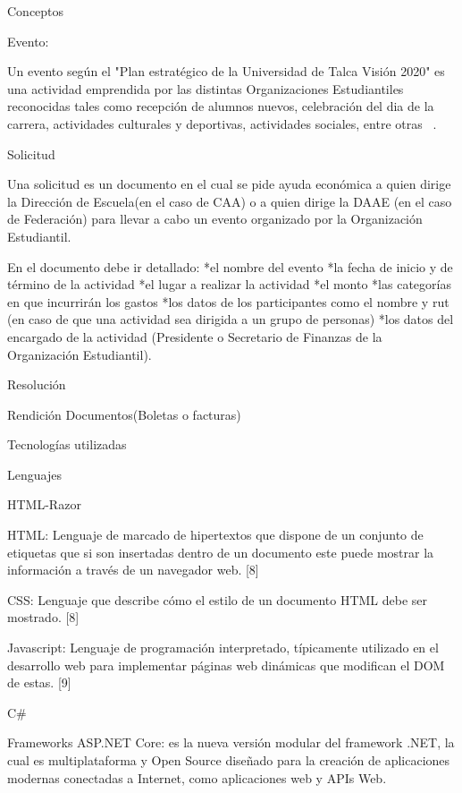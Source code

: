 Conceptos

Evento: 

Un evento según el "Plan estratégico de la Universidad de Talca Visión 2020" es una actividad emprendida por las distintas Organizaciones Estudiantiles reconocidas tales como recepción de alumnos nuevos, celebración del dia de la carrera, actividades culturales y deportivas, actividades sociales, entre otras ~\cite{5}.

Solicitud

Una solicitud es un documento en el cual se pide ayuda económica a quien dirige la Dirección de Escuela(en el caso de CAA) o a quien dirige la DAAE (en el caso de Federación) para llevar a cabo un evento organizado por la Organización Estudiantil. 

En el documento debe ir detallado:
 *el nombre del evento
 *la fecha de inicio y de término de la actividad 
 *el lugar a realizar la actividad 
 *el monto 
 *las categorías en que incurrirán los gastos
 *los datos de los participantes como el nombre y rut (en caso de que una actividad sea dirigida a un grupo de personas) 
 *los datos del encargado de la actividad (Presidente o Secretario de Finanzas de la Organización Estudiantil).

Resolución

Rendición
    Documentos(Boletas o facturas)

Tecnologías utilizadas

Lenguajes

HTML-Razor

HTML: Lenguaje de marcado de hipertextos que dispone de un conjunto de etiquetas que si son insertadas dentro de un documento este puede mostrar la información a través de un navegador web. [8]

CSS: Lenguaje que describe cómo el estilo de un documento HTML debe ser mostrado. [8]

Javascript: Lenguaje de programación interpretado, típicamente utilizado en el desarrollo web para implementar páginas web dinámicas que modifican el DOM de estas. [9]

C#

Frameworks
ASP.NET Core: es la nueva versión modular del framework .NET, la cual es multiplataforma y Open Source diseñado para la creación de aplicaciones modernas conectadas a Internet, como aplicaciones web y APIs Web. 
